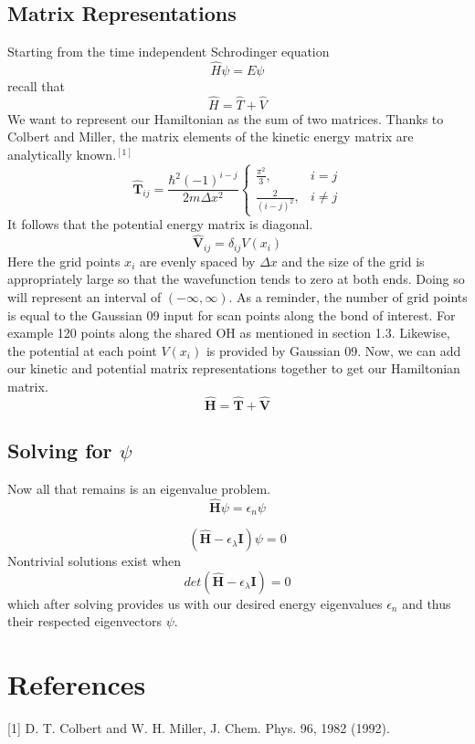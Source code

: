 \documentclass[12pt]{article}
\begin{document}
\subsection{Matrix Representations}
Starting from the time independent Schrodinger equation
\begin{equation}
\hat{H}\psi = E\psi
\end{equation}
recall that
\begin{equation}
\hat{H}=\hat{T}+\hat{V}
\end{equation}
We want to represent our Hamiltonian as the sum of two matrices.
Thanks to Colbert and Miller, the matrix elements of the kinetic energy matrix are analytically known.$^{[1]}$
\begin{equation}
\hat{\textbf{T}}_{ij} = \frac{\hbar^2(-1)^{i-j}}{2m\Delta{x^2}}
\begin{cases}
\frac{\pi^2}{3}, &i=j\\
\frac{2}{(i-j)^2}, &i\neq{j}
\end{cases}
\end{equation}
It follows that the potential energy matrix is diagonal. 
\begin{equation}
\hat{\textbf{V}}_{ij}=\delta_{ij}V(x_i)
\end{equation}
Here the grid points $x_i$ are evenly spaced by $\Delta{x}$ and the size of the grid is appropriately large so that the wavefunction tends to zero at both ends.
Doing so will represent an interval of $(-\infty, \infty)$.
As a reminder, the number of grid points is equal to the Gaussian 09 input for scan points along the bond of interest. 
For example 120 points along the shared OH as mentioned in section 1.3.
Likewise, the potential at each point $V(x_i)$ is provided by Gaussian 09.
Now, we can add our kinetic and potential matrix representations together to get our Hamiltonian matrix.
\begin{equation}
\hat{\textbf{H}}=\hat{\textbf{T}}+\hat{\textbf{V}}
\end{equation}

\subsection{Solving for $\psi$}
Now all that remains is an eigenvalue problem.
\begin{equation}
\hat{\textbf{H}}\psi=\epsilon_n\psi
\end{equation}

\begin{equation}
(\hat{\textbf{H}}-\epsilon_\lambda\textbf{I})\psi=0
\end{equation}
Nontrivial solutions exist when 
\begin{equation}
det(\hat{\textbf{H}}-\epsilon_\lambda\textbf{I})=0
\end{equation}
which after solving provides us with our desired energy eigenvalues $\epsilon_n$ and thus their respected eigenvectors $\psi$.

\section{References}
[1] D. T. Colbert and W. H. Miller, J. Chem. Phys. 96, 1982 (1992).
\end{document}
